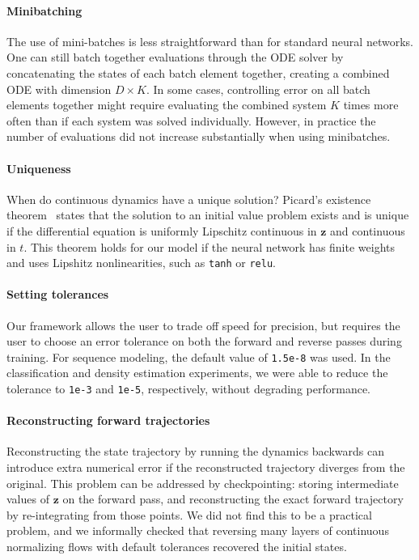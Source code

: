 \documentclass{article}
\newcommand{\vz}{\mathbf{z}}
\newcommand{\sol}{\vz}  %
\begin{document}
\paragraph{Minibatching}
The use of mini-batches is less straightforward than for standard neural networks.
One can still batch together evaluations through the ODE solver by concatenating the states of each batch element together, creating a combined ODE with dimension $D \times K$.
In some cases, controlling error on all batch elements together might require evaluating the combined system $K$ times more often than if each system was solved individually.
However, in practice the number of evaluations did not increase substantially when using minibatches.

\paragraph{Uniqueness}
When do continuous dynamics have a unique solution?
Picard's existence theorem~\citep{coddington1955theory} states that the solution to an initial value problem exists and is unique if the differential equation is uniformly Lipschitz continuous in $\sol$ and continuous in $t$.
This theorem holds for our model if the neural network has finite weights and uses Lipshitz nonlinearities, such as \texttt{tanh} or \texttt{relu}.

\paragraph{Setting tolerances}
Our framework allows the user to trade off speed for precision, but requires the user to choose an error tolerance on both the forward and reverse passes during training.
For sequence modeling, the default value of \texttt{1.5e-8} was used. In the classification and density estimation experiments, we were able to reduce the tolerance to \texttt{1e-3} and \texttt{1e-5}, respectively, without degrading performance.

\paragraph{Reconstructing forward trajectories}
Reconstructing the state trajectory by running the dynamics backwards can introduce extra numerical error if the reconstructed trajectory diverges from the original.
This problem can be addressed by checkpointing: storing intermediate values of $\sol$ on the forward pass, and reconstructing the exact forward trajectory by re-integrating from those points.
We did not find this to be a practical problem, and we informally checked that reversing many layers of continuous normalizing flows with default tolerances recovered the initial states.
\end{document}
